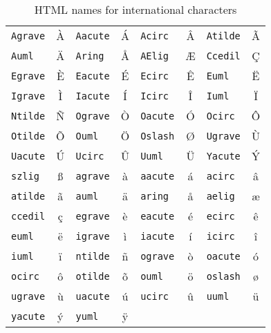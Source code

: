 \documentclass[12pt,a4paper]{article}
\begin{document}
\begin{table}
\centering
\begin{tabular}[t]{|l|c||l|c||l|c||l|c|} \hline
\texttt{Agrave}   & \`A   &
\texttt{Aacute}   & \'A   &
\texttt{Acirc}    & \^A   &
\texttt{Atilde}   & \~A   \\
\texttt{Auml}     & \"{A} &
\texttt{Aring}    & \AA   &
\texttt{AElig}    & \AE   &
\texttt{Ccedil}   & \c{C} \\
\texttt{Egrave}   & \`E   &
\texttt{Eacute}   & \'E   &
\texttt{Ecirc}    & \^E   &
\texttt{Euml}     & \"{E} \\
\texttt{Igrave}   & \`I   &
\texttt{Iacute}   & \'I   &
\texttt{Icirc}    & \^I   &
\texttt{Iuml}     & \"{I} \\
\texttt{Ntilde}   & \~N   &
\texttt{Ograve}   & \`O   &
\texttt{Oacute}   & \'O   &
\texttt{Ocirc}    & \^O   \\
\texttt{Otilde}   & \~O   &
\texttt{Ouml}     & \"{O} &
\texttt{Oslash}   & \O    &
\texttt{Ugrave}   & \`U   \\
\texttt{Uacute}   & \'U   &
\texttt{Ucirc}    & \^U   &
\texttt{Uuml}     & \"{U} &
\texttt{Yacute}   & \'Y   \\
\texttt{szlig}    & \ss   &
\texttt{agrave}   & \`a   &
\texttt{aacute}   & \'a   &
\texttt{acirc}    & \^a   \\
\texttt{atilde}   & \~a   &
\texttt{auml}     & \"{a} &
\texttt{aring}    & \aa   &
\texttt{aelig}    & \ae   \\
\texttt{ccedil}   & \c{c} &
\texttt{egrave}   & \`e   &
\texttt{eacute}   & \'e   &
\texttt{ecirc}    & \^e   \\
\texttt{euml}     & \"{e} &
\texttt{igrave}   & \`i   &
\texttt{iacute}   & \'i   &
\texttt{icirc}    & \^i   \\
\texttt{iuml}     & \"{i} &
\texttt{ntilde}   & \~n   &
\texttt{ograve}   & \`o   &
\texttt{oacute}   & \'o   \\
\texttt{ocirc}    & \^o   &
\texttt{otilde}   & \~o   &
\texttt{ouml}     & \"{o} &
\texttt{oslash}   & \o    \\
\texttt{ugrave}   & \`u   &
\texttt{uacute}   & \'u   &
\texttt{ucirc}    & \^u   &
\texttt{uuml}     & \"{u} \\
\texttt{yacute}   & \'y   &
\texttt{yuml}     & \"{y} &&&&\\ \hline
\end{tabular}
\caption{HTML names for international characters}
\label{tab:HTMLchars}
\end{table}
\end{document}
